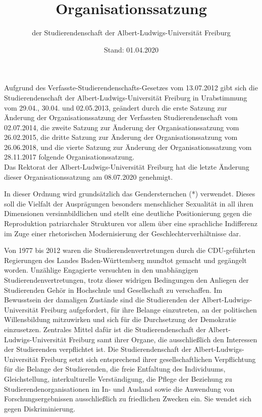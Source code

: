 \documentclass[fontsize=12pt,parskip=half]{scrartcl}
\begin{document}
\subject{Lesefassung}
\title{Organisationssatzung}
\subtitle{der Studierendenschaft der Albert-Ludwigs-Universität Freiburg}
\date{Stand: 01.04.2020}
\thispagestyle{empty}
\maketitle

\pagebreak
{}
\tableofcontents

\vspace*{\fill}

Aufgrund des Verfasste-Studierendenschafts-Gesetzes vom 13.07.2012 gibt sich die
Studierendenschaft der Albert-Ludwigs-Universität Freiburg in Urabstimmung vom
29.04., 30.04. und 02.05.2013, geändert durch die erste Satzung zur Änderung der
Organisationssatzung der Verfassten Studierendenschaft vom 02.07.2014, die
zweite Satzung zur Änderung der Organisationssatzung vom 26.02.2015, die
dritte Satzung zur Änderung der Organisationssatzung vom 26.06.2018, und die
vierte Satzung zur Änderung der Organisationssatzung vom 28.11.2017 folgende
Organisationssatzung.\\
Das Rektorat der Albert-Ludwigs-Universität Freiburg hat die letzte Änderung
dieser Organisationssatzung am 08.07.2020 genehmigt.

In dieser Ordnung wird grundsätzlich das Gendersternchen (*) verwendet. Dieses
soll die Vielfalt der Ausprägungen besonders menschlicher Sexualität in all
ihren Dimensionen versinnbildlichen und stellt eine deutliche Positionierung
gegen die Reproduktion patriarchaler Strukturen vor allem über eine sprachliche
Indifferenz im Zuge einer rhetorischen Modernisierung der
Geschlechterverhältnisse dar.

\pagebreak
{}


Von 1977 bis 2012 waren die Studierendenvertretungen durch die CDU-geführten
Regierungen des Landes Baden-Württemberg mundtot gemacht und gegängelt worden.
Unzählige Engagierte versuchten in den unabhängigen Studierendenvertretungen,
trotz dieser widrigen Bedingungen den Anliegen der Studierenden Gehör in
Hochschule und Gesellschaft zu verschaffen. Im Bewusstsein der damaligen
Zustände sind die Studierenden der Albert-Ludwigs-Universität Freiburg
aufgefordert, für ihre Belange einzutreten, an der politischen Willensbildung
mitzuwirken und sich für die Durchsetzung der Demokratie einzusetzen. Zentrales
Mittel dafür ist die Studierendenschaft der Albert-Ludwigs-Universität Freiburg
samt ihrer Organe, die ausschließlich den Interessen der Studierenden
verpflichtet ist.
Die Studierendenschaft der Albert-Ludwigs-Universität Freiburg setzt sich
entsprechend ihrer gesellschaftlichen Verpflichtung für die Belange der
Studierenden, die freie Entfaltung des Individuums, Gleichstellung,
interkulturelle Verständigung, die Pflege der Beziehung zu
Studierendenorganisationen im In- und Ausland sowie die Anwendung von
Forschungsergebnissen ausschließlich zu friedlichen Zwecken ein. Sie wendet sich
gegen Diskriminierung.
\end{document}
